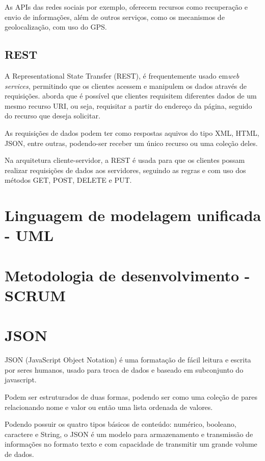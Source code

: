 As APIs das redes sociais por exemplo, oferecem recursos como recuperação e envio de informações, além de outros serviços, como os mecanismos de geolocalização, com uso do GPS.

\subsection{REST}
A Representational State Transfer (REST), é frequentemente usado em\textit{web services}, permitindo que os clientes acessem e manipulem os dados através de requisições. \cite{zhou2014} aborda que é possível que clientes requisitem diferentes dados de um mesmo recurso URI, ou seja, requisitar a partir do endereço da página, seguido do recurso que deseja solicitar.  

As requisições de dados podem ter como respostas aquivos do tipo XML, HTML, JSON, entre outras, podendo-ser receber um único recurso ou 
uma coleção deles.

Na arquitetura cliente-servidor, a REST é usada para que os clientes possam realizar requisições de dados aos servidores, seguindo as regras e com uso dos métodos GET, POST, DELETE e PUT.  

\section{Linguagem de modelagem unificada - UML}

\section{Metodologia de desenvolvimento - SCRUM}

\section{JSON}
JSON (JavaScript Object Notation) é uma formatação de fácil leitura e escrita por seres humanos, usado para troca de dados e baseado em subconjunto do javascript.

Podem ser estruturados de duas formas, podendo ser como uma coleção de pares relacionando nome e valor ou então uma lista ordenada de valores. 

Podendo possuir os quatro tipos básicos de conteúdo: numérico, booleano, caractere e String, o JSON é um modelo para armazenamento e transmissão de informações no formato texto e com capacidade de transmitir um grande volume de dados.

